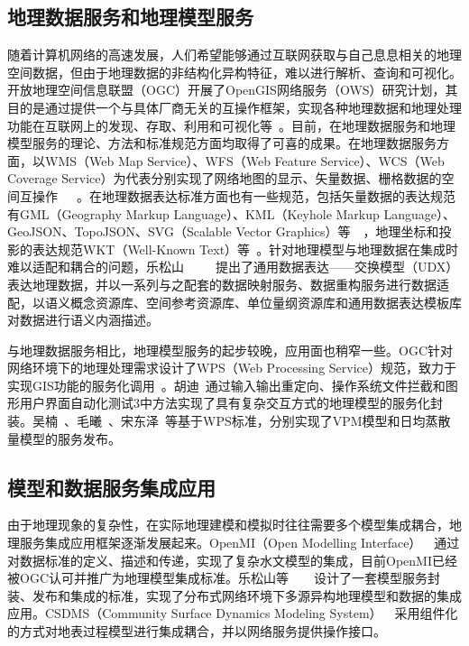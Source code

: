 \subsection{地理数据服务和地理模型服务}
随着计算机网络的高速发展，人们希望能够通过互联网获取与自己息息相关的地理空间数据，但由于地理数据的非结构化异构特征，难以进行解析、查询和可视化。开放地理空间信息联盟（OGC）开展了OpenGIS网络服务（OWS）研究计划，其目的是通过提供一个与具体厂商无关的互操作框架，实现各种地理数据和地理处理功能在互联网上的发现、存取、利用和可视化等~\cite{lake2009infrastructure}。目前，在地理数据服务和地理模型服务的理论、方法和标准规范方面均取得了可喜的成果。在地理数据服务方面，以WMS（Web Map Service）、WFS（Web Feature Service）、WCS（Web Coverage Service）为代表分别实现了网络地图的显示、矢量数据、栅格数据的空间互操作~\cite{OGC-WMS}~\cite{OGC-WCS}~\cite{OGC-WFS}。在地理数据表达标准方面也有一些规范，包括矢量数据的表达规范有GML（Geography Markup Language）、KML（Keyhole Markup Language）、GeoJSON、TopoJSON、SVG（Scalable Vector Graphics）等~\cite{GML}~\cite{KML}，地理坐标和投影的表达规范WKT（Well-Known Text）等~\cite{lott2015geographic}。针对地理模型与地理数据在集成时难以适配和耦合的问题，乐松山~\cite{Yue2015A}~\cite{Yue2013Key}~\cite{yue2015data}~\cite{wang2018study}~\cite{2016-yuesongshan-phd}提出了通用数据表达——交换模型（UDX）表达地理数据，并以一系列与之配套的数据映射服务、数据重构服务进行数据适配，以语义概念资源库、空间参考资源库、单位量纲资源库和通用数据表达模板库对数据进行语义内涵描述。

与地理数据服务相比，地理模型服务的起步较晚，应用面也稍窄一些。OGC针对网络环境下的地理处理需求设计了WPS（Web Processing Service）规范，致力于实现GIS功能的服务化调用~\cite{OGC-WPS}。胡迪~\cite{2015-hudi-2}通过输入输出重定向、操作系统文件拦截和图形用户界面自动化测试3中方法实现了具有复杂交互方式的地理模型的服务化封装。吴楠~\cite{2012-wunan}、毛曦~\cite{2012-maoxi--2}、宋东泽~\cite{2015-songdongze}等基于WPS标准，分别实现了VPM模型和日均蒸散量模型的服务发布。

\subsection{模型和数据服务集成应用}
由于地理现象的复杂性，在实际地理建模和模拟时往往需要多个模型集成耦合，地理服务集成应用框架逐渐发展起来。OpenMI（Open Modelling Interface）~\cite{MOORE2005279}~\cite{gregersen2007openmi}通过对数据标准的定义、描述和传递，实现了复杂水文模型的集成，目前OpenMI已经被OGC认可并推广为地理模型集成标准。乐松山等~\cite{yue2016service}~\cite{zhang2019design}~\cite{wen2017model}~\cite{yue2018loosely}设计了一套模型服务封装、发布和集成的标准，实现了分布式网络环境下多源异构地理模型和数据的集成应用。CSDMS（Community Surface Dynamics Modeling System）~\cite{Peckham2013A}~\cite{peckham2009componentizing}采用组件化的方式对地表过程模型进行集成耦合，并以网络服务提供操作接口。


